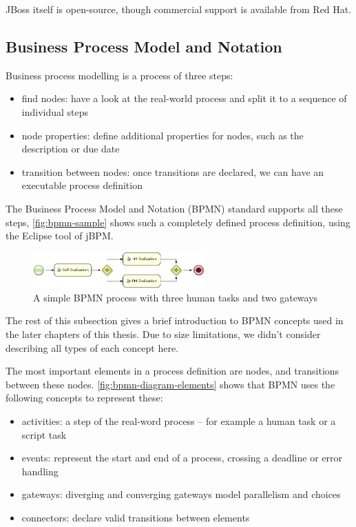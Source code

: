 JBoss itself is open-source, though commercial support is available from Red Hat.

\subsection{Business Process Model and Notation}
\label{sec:bpmn}


Business process modelling is a process of three steps:

\begin{itemize}
\item find nodes: have a look at the real-world process and split it to a sequence of individual steps
\item node properties: define additional properties for nodes, such as the description or due date
\item transition between nodes: once transitions are declared, we can have an executable process definition
\end{itemize}

The Business Process Model and Notation (BPMN) standard \cite{bpmn} supports all
these steps, \autoref{fig:bpmn-sample} shows such a completely defined
process definition, using the Eclipse tool of jBPM.

\begin{figure}[H]
\centering
\includegraphics[width=250px,keepaspectratio]{bpmn-sample.png}
\caption{A simple BPMN process with three human tasks and two gateways}
\label{fig:bpmn-sample}
\end{figure}

The rest of this subsection gives a brief introduction to BPMN concepts used in
the later chapters of this thesis. Due to size limitations, we didn't consider
describing all types of each concept here.


The most important elements in a process definition are nodes, and transitions
between these nodes. \autoref{fig:bpmn-diagram-elements} shows that BPMN
uses the following concepts to represent these:

\begin{itemize}
\item activities: a step of the real-word process -- for example a human task or a script task
\item events: represent the start and end of a process, crossing a deadline or error handling
\item gateways: diverging and converging gateways model parallelism and choices
\item connectors: declare valid transitions between elements
\end{itemize}

